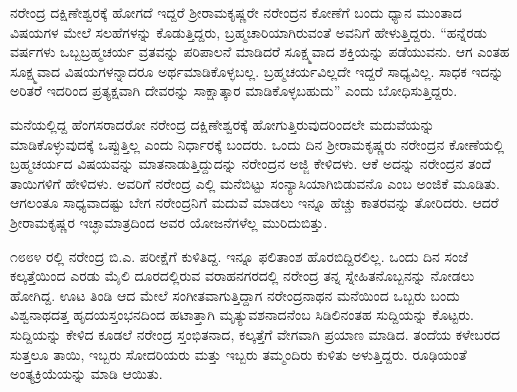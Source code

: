 \vskip 2pt

ನರೇಂದ್ರ ದಕ್ಷಿಣೇಶ್ವರಕ್ಕೆ ಹೋಗದೆ ಇದ್ದರೆ ಶ‍್ರೀರಾಮಕೃಷ್ಣರೇ ನರೇಂದ್ರನ ಕೋಣೆಗೆ ಬಂದು ಧ್ಯಾನ ಮುಂತಾದ ವಿಷಯಗಳ ಮೇಲೆ ಸಲಹೆಗಳನ್ನು ಕೊಡುತ್ತಿದ್ದರು, ಬ್ರಹ್ಮಚಾರಿಯಾಗಿರುವಂತೆ ಅವನಿಗೆ ಹೇಳುತ್ತಿದ್ದರು. “ಹನ್ನೆರಡು ವರ್ಷಗಳು ಒಬ್ಬ\break ಬ್ರಹ್ಮಚರ್ಯ ವ್ರತವನ್ನು ಪರಿಪಾಲನೆ ಮಾಡಿದರೆ ಸೂಕ್ಷ್ಮವಾದ ಶಕ್ತಿಯನ್ನು ಪಡೆಯುವನು. ಆಗ ಎಂತಹ ಸೂಕ್ಷ್ಮವಾದ ವಿಷಯಗಳನ್ನಾದರೂ ಅರ್ಥಮಾಡಿಕೊಳ್ಳಬಲ್ಲ. ಬ್ರಹ್ಮಚರ್ಯವಿಲ್ಲದೇ ಇದ್ದರೆ ಸಾಧ್ಯವಿಲ್ಲ. ಸಾಧಕ ಇದನ್ನು ಅರಿತರೆ ಇದರಿಂದ ಪ್ರತ್ಯಕ್ಷವಾಗಿ ದೇವರನ್ನು ಸಾಕ್ಷಾತ್ಕಾರ ಮಾಡಿಕೊಳ್ಳಬಹುದು” ಎಂದು ಬೋಧಿಸುತ್ತಿದ್ದರು.

\vskip 2pt

ಮನೆಯಲ್ಲಿದ್ದ ಹೆಂಗಸರಾದರೋ ನರೇಂದ್ರ ದಕ್ಷಿಣೇಶ್ವರಕ್ಕೆ ಹೋಗುತ್ತಿರುವುದ\break ರಿಂದಲೇ ಮದುವೆಯನ್ನು ಮಾಡಿಕೊಳ್ಳುವುದಕ್ಕೆ ಒಪ್ಪುತ್ತಿಲ್ಲ ಎಂದು ನಿರ್ಧಾರಕ್ಕೆ ಬಂದರು. ಒಂದು ದಿನ ಶ‍್ರೀರಾಮಕೃಷ್ಣರು ನರೇಂದ್ರನ ಕೋಣೆಯಲ್ಲಿ ಬ್ರಹ್ಮಚರ್ಯದ ವಿಷಯವನ್ನು ಮಾತನಾಡುತ್ತಿದ್ದುದನ್ನು ನರೇಂದ್ರನ ಅಜ್ಜಿ ಕೇಳಿದಳು. ಆಕೆ ಅದನ್ನು ನರೇಂದ್ರನ ತಂದೆ ತಾಯಿಗಳಿಗೆ ಹೇಳಿದಳು. ಅವರಿಗೆ ನರೇಂದ್ರ ಎಲ್ಲಿ ಮನೆಬಿಟ್ಟು ಸಂನ್ಯಾಸಿಯಾಗಿಬಿಡುವನೊ ಎಂಬ ಅಂಜಿಕೆ ಮೂಡಿತು. ಆಗಲಂತೂ ಸಾಧ್ಯವಾದಷ್ಟು ಬೇಗ ನರೇಂದ್ರನಿಗೆ ಮದುವೆ ಮಾಡಲು ಇನ್ನೂ ಹೆಚ್ಚು ಕಾತರವನ್ನು ತೋರಿದರು. ಆದರೆ ಶ‍್ರೀರಾಮಕೃಷ್ಣರ ಇಚ್ಛಾಮಾತ್ರದಿಂದ ಅವರ ಯೋಜನೆಗಳೆಲ್ಲ ಮುರಿದುಬಿತ್ತು.

೧೮೮೪ ರಲ್ಲಿ ನರೇಂದ್ರ ಬಿ.ಎ. ಪರೀಕ್ಷೆಗೆ ಕುಳಿತಿದ್ದ. ಇನ್ನೂ ಫಲಿತಾಂಶ ಹೊರಬಿದ್ದಿರಲಿಲ್ಲ. ಒಂದು ದಿನ ಸಂಜೆ ಕಲ್ಕತ್ತೆಯಿಂದ ಎರಡು ಮೈಲಿ ದೂರದಲ್ಲಿರುವ ವರಾಹನಗರದಲ್ಲಿ ನರೇಂದ್ರ ತನ್ನ ಸ್ನೇಹಿತನೊಬ್ಬನನ್ನು ನೋಡಲು ಹೋಗಿದ್ದ. ಊಟ ತಿಂಡಿ ಆದ ಮೇಲೆ ಸಂಗೀತವಾಗುತ್ತಿದ್ದಾಗ ನರೇಂದ್ರನಾಥನ ಮನೆಯಿಂದ ಒಬ್ಬರು ಬಂದು ವಿಶ್ವನಾಥದತ್ತ ಹೃದಯಸ್ತಂಭನದಿಂದ ಹಟಾತ್ತಾಗಿ ಮೃತ್ಯುವಶನಾದನೆಂಬ ಸಿಡಿಲಿನಂತಹ ಸುದ್ದಿಯನ್ನು ಕೊಟ್ಟರು. ಸುದ್ದಿಯನ್ನು ಕೇಳಿದ ಕೂಡಲೆ ನರೇಂದ್ರ ಸ್ತಂಭಿತನಾದ, ಕಲ್ಕತ್ತೆಗೆ ವೇಗವಾಗಿ ಪ್ರಯಾಣ ಮಾಡಿದ. ತಂದೆಯ ಕಳೇಬರದ ಸುತ್ತಲೂ ತಾಯಿ, ಇಬ್ಬರು ಸೋದರಿಯರು ಮತ್ತು ಇಬ್ಬರು ತಮ್ಮಂದಿರು ಕುಳಿತು ಅಳುತ್ತಿದ್ದರು. ರೂಢಿಯಂತೆ ಅಂತ್ಯಕ್ರಿಯೆಯನ್ನು ಮಾಡಿ ಆಯಿತು.

